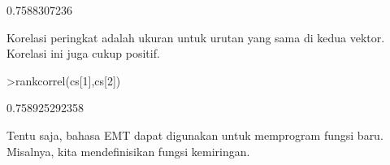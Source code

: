 \documentclass[a4paper,10pt]{article}
\begin{document}
\begin{eulernotebook}
\begin{eulercomment}
\begin{eulercomment}
\begin{eulercomment}
\begin{eulercomment}
\begin{eulercomment}
\begin{eulercomment}
\begin{eulercomment}
\begin{eulercomment}
\begin{eulercomment}
\begin{eulercomment}
\begin{eulercomment}
\begin{eulercomment}
\begin{eulercomment}
\begin{eulercomment}
\begin{eulercomment}
\begin{eulercomment}
\begin{eulercomment}
\begin{eulercomment}
\begin{eulercomment}
\begin{eulercomment}
\begin{eulercomment}
\begin{eulercomment}
\begin{eulercomment}
\begin{eulercomment}
\begin{eulercomment}
\begin{eulercomment}
\begin{eulercomment}
\begin{eulercomment}
\begin{eulercomment}
\begin{eulercomment}
\begin{eulercomment}
\begin{eulercomment}
\begin{euleroutput}
  0.7588307236
\end{euleroutput}
\begin{eulercomment}
Korelasi peringkat adalah ukuran untuk urutan yang sama di kedua
vektor. Korelasi ini juga cukup positif.
\end{eulercomment}
\begin{eulerprompt}
>rankcorrel(cs[1],cs[2])
\end{eulerprompt}
\begin{euleroutput}
  0.758925292358
\end{euleroutput}
\begin{eulercomment}
Tentu saja, bahasa EMT dapat digunakan untuk memprogram fungsi baru.
Misalnya, kita mendefinisikan fungsi kemiringan.


\end{eulercomment}
\end{eulercomment}
\end{eulercomment}
\end{eulercomment}
\end{eulercomment}
\end{eulercomment}
\end{eulercomment}
\end{eulercomment}
\end{eulercomment}
\end{eulercomment}
\end{eulercomment}
\end{eulercomment}
\end{eulercomment}
\end{eulercomment}
\end{eulercomment}
\end{eulercomment}
\end{eulercomment}
\end{eulercomment}
\end{eulercomment}
\end{eulercomment}
\end{eulercomment}
\end{eulercomment}
\end{eulercomment}
\end{eulercomment}
\end{eulercomment}
\end{eulercomment}
\end{eulercomment}
\end{eulercomment}
\end{eulercomment}
\end{eulercomment}
\end{eulercomment}
\end{eulercomment}
\end{eulercomment}
\end{eulernotebook}
\end{document}
